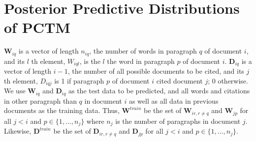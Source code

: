 \section{Posterior Predictive Distributions of PCTM}

$\mathbf{W}_{iq}$ is a vector of length $n_{iq}$, the number of words in paragraph $q$ of document $i$, and its $l$ th element, $W_{iql}$, is the $l$ the word in paragraph $p$ of document $i$.
$\mathbf{D}_{iq}$ is a vector of length $i-1$, the number of all possible documents to be cited, and its $j$ th element, $D_{iqj}$ is 1 if paragraph $p$ of document $i$ cited document $j$; 0 otherwise.
We use $\mathbf{W}_{iq}$ and $\mathbf{D}_{iq}$ as the test data to be predicted, and all words and citations in other paragraph than $q$ in document $i$ as well as all data in previous documents as the training data.
Thus, $\mathbf{W}^{train}$ be the set of $\mathbf{W}_{ir, r \neq q}$ and $\mathbf{W}_{jp}$ for all $j < i$ and $p \in \{1 , \ldots , n_j\}$ where $n_j$ is the number of paragraphs in document $j$.
Likewise, $\mathbf{D}^{train}$ be the set of $\mathbf{D}_{ir, r \neq q}$ and $\mathbf{D}_{jp}$ for all $j < i$ and $p \in \{1 , \ldots , n_j\}$.

